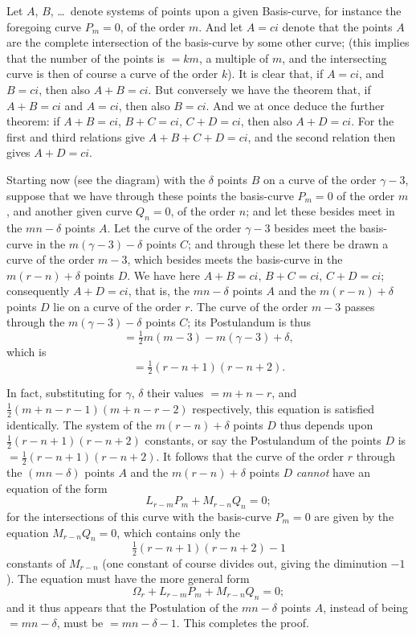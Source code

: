 \documentclass[11pt,a4paper]{book}
\begin{document}
Let $A$, $B$, \ldots\ denote systems of points upon a given Basis-curve, for instance
the foregoing curve $P_m = 0$, of the order $m$. And let $A = ci$ denote that the points
$A$ are the complete intersection of the basis-curve by some other curve; (this implies
that the number of the points is $= km$, a multiple of $m$, and the intersecting curve is
then of course a curve of the order $k$). It is clear that, if $A = ci$, and $B = ci$, then
also $A + B = ci$. But conversely we have the theorem that, if $A + B = ci$ and $A = ci$,
then also $B = ci$. And we at once deduce the further theorem: if $A + B = ci$, $B + C = ci$,
$C + D = ci$, then also $A + D = ci$. For the first and third relations give $A + B + C + D = ci$,
and the second relation then gives $A + D = ci$.

Starting now (see the diagram) with the $\delta$ points $B$ on a curve of the order
$\gamma - 3$, suppose that we have through these points the basis-curve $P_m = 0$ of the order
$m$, and another given curve $Q_n = 0$, of the order $n$; and let these besides meet in
the $mn - \delta$ points $A$. Let the curve of the order $\gamma - 3$ besides meet the basis-curve
in the $m(\gamma-3) - \delta$ points $C$; and through these let there be drawn a curve of the
order $m - 3$, which besides meets the basis-curve in the $m(r-n) + \delta$ points $D$. We
have here $A + B = ci$, $B + C = ci$, $C + D = ci$; consequently $A + D = ci$, that is, the
$mn - \delta$ points $A$ and the $m(r-n) + \delta$ points $D$ lie on a curve of the order $r$. The
curve of the order $m - 3$ passes through the $m(\gamma-3) - \delta$ points $C$; its Postulandum is thus
\[
= \tfrac12 m(m-3) - m(\gamma-3) + \delta,
\]
which is
\[
= \tfrac12(r-n+1)(r-n+2).
\]

In fact, substituting for $\gamma$, $\delta$ their values $= m + n - r$, and
$\tfrac12(m+n-r-1)(m+n-r-2)$
respectively, this equation is satisfied identically. The system of the $m(r-n) + \delta$ points
$D$ thus depends upon $\tfrac12(r-n+1)(r-n+2)$ constants, or say the Postulandum of
the points $D$ is $= \tfrac12(r-n+1)(r-n+2)$. It follows that the curve of the order $r$
through the $(mn - \delta)$ points $A$ and the $m(r-n) + \delta$ points $D$ \textit{cannot} have an equation
of the form
\[
L_{r-m} P_m + M_{r-n} Q_n = 0;
\]
for the intersections of this curve with the basis-curve $P_m = 0$ are given by the
equation $M_{r-n} Q_n = 0$, which contains only the
\[
\tfrac12(r-n+1)(r-n+2) - 1
\]
constants of $M_{r-n}$ (one constant of course divides out, giving the diminution $-1$).
The equation must have the more general form
\[
\Omega_r + L_{r-m} P_m + M_{r-n} Q_n = 0;
\]
and it thus appears that the Postulation of the $mn - \delta$ points $A$, instead of being
$= mn - \delta$, must be $= mn - \delta - 1$. This completes the proof.
\end{document}
